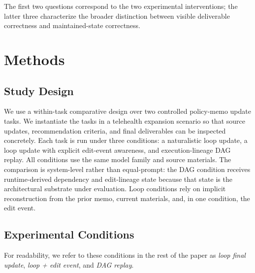 \documentclass{article}
\begin{document}
The first two questions correspond to the two experimental interventions; the latter three characterize the broader distinction between visible deliverable correctness and maintained-state correctness.

\section{Methods}

\subsection{Study Design}

We use a within-task comparative design over two controlled policy-memo update tasks. We instantiate the tasks in a telehealth expansion scenario so that source updates, recommendation criteria, and final deliverables can be inspected concretely. Each task is run under three conditions: a naturalistic loop update, a loop update with explicit edit-event awareness, and execution-lineage DAG replay. All conditions use the same model family and source materials. The comparison is system-level rather than equal-prompt: the DAG condition receives runtime-derived dependency and edit-lineage state because that state is the architectural substrate under evaluation. Loop conditions rely on implicit reconstruction from the prior memo, current materials, and, in one condition, the edit event.

\subsection{Experimental Conditions}

For readability, we refer to these conditions in the rest of the paper as \emph{loop final update}, \emph{loop + edit event}, and \emph{DAG replay}.
\end{document}
